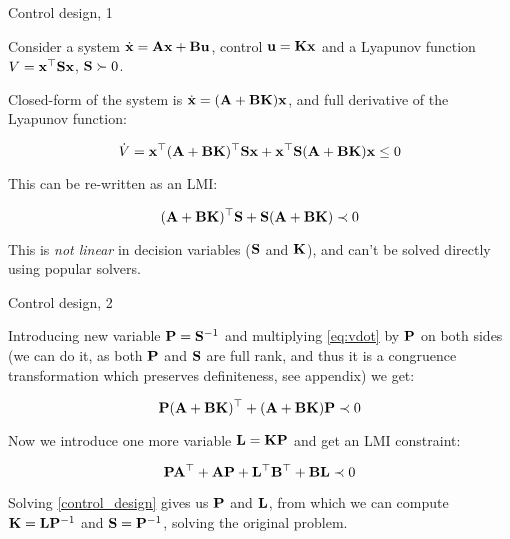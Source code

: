 \documentclass{beamer}
\begin{document}
\begin{frame}{Control design, 1}
	\begin{flushleft}
		
		Consider a system $\dot{\mathbf{x}} = \mathbf{A}\mathbf{x} + \mathbf{B}\mathbf{u}$, control $\mathbf{u} = \mathbf{K}\mathbf{x}$ and a Lyapunov function $V = \mathbf{x}^\top\mathbf{S}\mathbf{x}$, $\mathbf{S} \succ 0$.
		
		\bigskip
		
		Closed-form of the system is $\dot{\mathbf{x}} = (\mathbf{A} + \mathbf{B}\mathbf{K})\mathbf{x}$, and full derivative of the Lyapunov function:
		
		\begin{equation}
			\dot V = \mathbf{x}^\top (\mathbf{A} + \mathbf{B}\mathbf{K})^\top\mathbf{S}\mathbf{x} + \mathbf{x}^\top\mathbf{S} (\mathbf{A} + \mathbf{B}\mathbf{K}) \mathbf{x} \leq 0
		\end{equation}
		
		This can be re-written as an LMI:
		
		\begin{equation}
			\label{eq:vdot}
			(\mathbf{A} + \mathbf{B}\mathbf{K})^\top\mathbf{S} + \mathbf{S} (\mathbf{A} + \mathbf{B}\mathbf{K}) \prec 0
		\end{equation}
		
		This is \emph{not linear} in decision variables ($\mathbf{S}$ and $\mathbf{K}$), and can't be solved directly using popular solvers.
		
	\end{flushleft}
\end{frame}




\begin{frame}{Control design, 2}
	\begin{flushleft}
		
		Introducing new variable $\mathbf{P} = \mathbf{S}^{-1}$ and multiplying \eqref{eq:vdot} by $\mathbf{P}$ on both sides (we can do it, as both $\mathbf{P}$ and $\mathbf{S}$ are full rank, and thus it is a congruence transformation which preserves definiteness, see appendix) we get:
		
		\begin{equation}
			\mathbf{P}(\mathbf{A} + \mathbf{B}\mathbf{K})^\top + (\mathbf{A} + \mathbf{B}\mathbf{K})\mathbf{P} \prec 0
		\end{equation}
		
		Now we introduce one more variable $\mathbf{L} = \mathbf{K}\mathbf{P}$ and get an LMI constraint:
		
		\begin{equation}
			\label{control_design}
			\mathbf{P}\mathbf{A}^\top + \mathbf{A}\mathbf{P} + \mathbf{L}^\top\mathbf{B}^\top + \mathbf{B}\mathbf{L} \prec 0
		\end{equation}
		
		Solving \eqref{control_design} gives us $\mathbf{P}$ and $\mathbf{L}$, from which we can compute $\mathbf{K} = \mathbf{L}\mathbf{P}^{-1}$ and $\mathbf{S} = \mathbf{P}^{-1}$, solving the original problem.
		
	\end{flushleft}
\end{frame}
\end{document}
